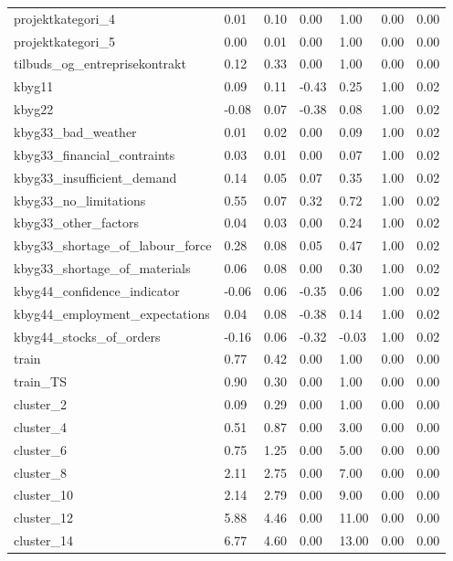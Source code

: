 \begin{landscape}
\begin{longtable}[h!]{lllllll}
projektkategori_4 & 0.01 & 0.10 & 0.00 & 1.00 & 0.00 & 0.00 \\
projektkategori_5 & 0.00 & 0.01 & 0.00 & 1.00 & 0.00 & 0.00 \\
tilbuds_og_entreprisekontrakt & 0.12 & 0.33 & 0.00 & 1.00 & 0.00 & 0.00 \\
kbyg11 & 0.09 & 0.11 & -0.43 & 0.25 & 1.00 & 0.02 \\
kbyg22 & -0.08 & 0.07 & -0.38 & 0.08 & 1.00 & 0.02 \\
kbyg33_bad_weather & 0.01 & 0.02 & 0.00 & 0.09 & 1.00 & 0.02 \\
kbyg33_financial_contraints & 0.03 & 0.01 & 0.00 & 0.07 & 1.00 & 0.02 \\
kbyg33_insufficient_demand & 0.14 & 0.05 & 0.07 & 0.35 & 1.00 & 0.02 \\
kbyg33_no_limitations & 0.55 & 0.07 & 0.32 & 0.72 & 1.00 & 0.02 \\
kbyg33_other_factors & 0.04 & 0.03 & 0.00 & 0.24 & 1.00 & 0.02 \\
kbyg33_shortage_of_labour_force & 0.28 & 0.08 & 0.05 & 0.47 & 1.00 & 0.02 \\
kbyg33_shortage_of_materials & 0.06 & 0.08 & 0.00 & 0.30 & 1.00 & 0.02 \\
kbyg44_confidence_indicator & -0.06 & 0.06 & -0.35 & 0.06 & 1.00 & 0.02 \\
kbyg44_employment_expectations & 0.04 & 0.08 & -0.38 & 0.14 & 1.00 & 0.02 \\
kbyg44_stocks_of_orders & -0.16 & 0.06 & -0.32 & -0.03 & 1.00 & 0.02 \\
train & 0.77 & 0.42 & 0.00 & 1.00 & 0.00 & 0.00 \\
train_TS & 0.90 & 0.30 & 0.00 & 1.00 & 0.00 & 0.00 \\
cluster_2 & 0.09 & 0.29 & 0.00 & 1.00 & 0.00 & 0.00 \\
cluster_4 & 0.51 & 0.87 & 0.00 & 3.00 & 0.00 & 0.00 \\
cluster_6 & 0.75 & 1.25 & 0.00 & 5.00 & 0.00 & 0.00 \\
cluster_8 & 2.11 & 2.75 & 0.00 & 7.00 & 0.00 & 0.00 \\
cluster_10 & 2.14 & 2.79 & 0.00 & 9.00 & 0.00 & 0.00 \\
cluster_12 & 5.88 & 4.46 & 0.00 & 11.00 & 0.00 & 0.00 \\
cluster_14 & 6.77 & 4.60 & 0.00 & 13.00 & 0.00 & 0.00 \\
\end{longtable}\end{landscape}
